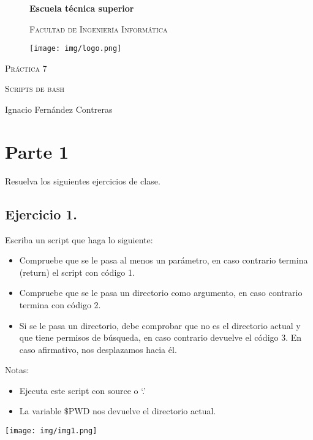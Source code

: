 \documentclass{article}
\begin{document}
\begin{titlepage}
\centering
\begin{figure}
\centering
{\bfseries\LARGE Escuela técnica superior\par}
{\scshape\Large Facultad de Ingeniería Informática\par}
\vspace{5cm}
\centering
 \texttt{[image: img/logo.png]} 

\end{figure}


{\scshape\Huge Práctica 7\par}
{\scshape\Large  Scripts de bash\par}
\vspace{9cm}
{\Large Ignacio Fernández Contreras\par}
\vfill
\end{titlepage}
\clearpage\hbox{}\thispagestyle{empty}\newpage

\section{Parte 1}
Resuelva los siguientes ejercicios de clase.
\subsection{Ejercicio 1.}
Escriba un script que haga lo siguiente:
\begin{itemize}
\item Compruebe que se le pasa al menos un parámetro, en caso contrario
termina (return) el script con código 1.
\item Compruebe que se le pasa un directorio como argumento, en caso
contrario termina con código 2.
\item Si se le pasa un directorio, debe comprobar que no es el directorio
actual y que tiene permisos de búsqueda, en caso contrario devuelve
el código 3. En caso afirmativo, nos desplazamos hacia él.
\end{itemize}
Notas:
\begin{itemize}
\item Ejecuta este script con source o ‘.’ 
\item La variable $\$$PWD nos devuelve el directorio actual.
\end{itemize}

\begin{center}
\texttt{[image: img/img1.png]} 
\end{center}
\end{document}
